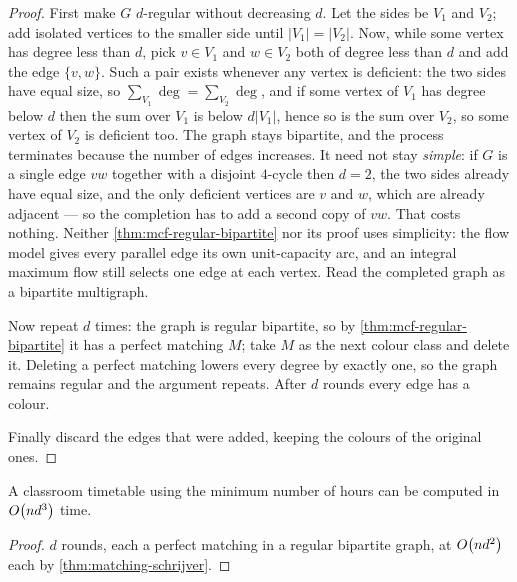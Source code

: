 \begin{proof}
First make $G$ $d$-regular without decreasing $d$. Let the sides be $V_1$ and
$V_2$; add isolated vertices to the smaller side until $|V_1| = |V_2|$. Now,
while some vertex has degree less than $d$, pick $v \in V_1$ and $w \in V_2$
both of degree less than $d$ and add the edge $\{v,w\}$. Such a pair exists
whenever any vertex is deficient: the two sides have equal size, so
$\sum_{V_1} \deg = \sum_{V_2} \deg$, and if some vertex of $V_1$ has degree
below $d$ then the sum over $V_1$ is below $d|V_1|$, hence so is the sum over
$V_2$, so some vertex of $V_2$ is deficient too. The graph stays bipartite,
and the process terminates because the number of edges increases. It need not
stay \emph{simple}: if $G$ is a single edge $vw$ together with a disjoint
$4$-cycle then $d = 2$, the two sides already have equal size, and the only
deficient vertices are $v$ and $w$, which are already adjacent --- so the
completion has to add a second copy of $vw$. That costs nothing. Neither
\cref{thm:mcf-regular-bipartite} nor its proof uses simplicity: the flow model
gives every parallel edge its own unit-capacity arc, and an integral maximum
flow still selects one edge at each vertex. Read the completed graph as a
bipartite multigraph.

Now repeat $d$ times: the graph is regular bipartite, so by
\cref{thm:mcf-regular-bipartite} it has a perfect matching $M$; take $M$ as the
next colour class and delete it. Deleting a perfect matching lowers every degree
by exactly one, so the graph remains regular and the argument repeats. After $d$
rounds every edge has a colour.

Finally discard the edges that were added, keeping the colours of the original
ones.
\end{proof}

\begin{corollary}
A classroom timetable using the minimum number of hours can be computed in
$O\!\left(nd^3\right)$ time.
\end{corollary}

\begin{proof}
$d$ rounds, each a perfect matching in a regular bipartite graph, at
$O\!\left(nd^2\right)$ each by \cref{thm:matching-schrijver}.
\end{proof}

